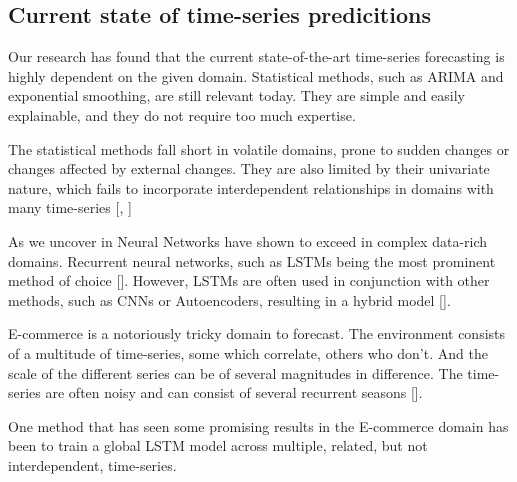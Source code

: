 \subsection{Current state of time-series predicitions}


Our research has found that the current state-of-the-art time-series forecasting is highly dependent
on the given domain. Statistical methods, such as ARIMA and exponential smoothing,
are still relevant today. They are simple and easily explainable, and they do not require
too much expertise.

The statistical methods fall short in volatile domains, prone to sudden changes or changes affected by external changes.
They are also limited by their univariate nature, which fails to
incorporate interdependent relationships in domains with many time-series [, ]

As we uncover in  Neural Networks have shown to exceed in complex data-rich domains. Recurrent neural networks, such as LSTMs being the most
prominent method of choice []. However, LSTMs are often used in conjunction with other methods, such as CNNs or Autoencoders,
resulting in a hybrid model [].

E-commerce is a notoriously tricky domain to forecast. The environment consists of a multitude of time-series,
some which correlate, others who don't. And the scale of the different series can be of several magnitudes in difference.
The time-series are often noisy and can consist of several recurrent seasons [].

One method that has seen some promising results in the E-commerce domain has been to train a global LSTM model across multiple,
related, but not interdependent, time-series.
